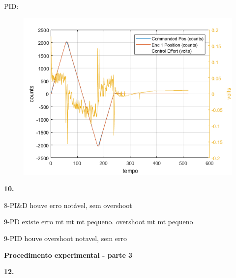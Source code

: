 \documentclass[a4paper,11pt]{article}
\begin{document}
PID:

\begin{figure}[H]
\includegraphics{q09-pid}
\centering
\end{figure}

\textbf{10.}

8-PI\&D houve erro notável, sem overshoot

9-PD existe erro mt mt mt pequeno. overshoot mt mt pequeno

9-PID houve overshoot notavel, sem erro

\textbf{Procedimento experimental - parte 3}

\textbf{12.}
\end{document}
